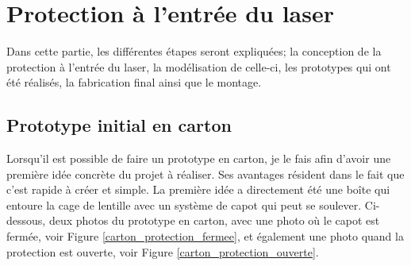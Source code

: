 \section{Protection à l'entrée du laser}
Dans cette partie, les différentes étapes seront expliquées; la conception de la protection à l'entrée du laser, la modélisation de celle-ci, les prototypes qui ont été réalisés, la fabrication final ainsi que le montage.
\subsection{Prototype initial en carton}
Lorsqu'il est possible de faire un prototype en carton, je le fais afin d'avoir une première idée concrète du projet à réaliser. Ses avantages résident dans le fait que c'est rapide à créer et simple. La première idée a directement été une boîte qui entoure la cage de lentille avec un système de capot qui peut se soulever. Ci-dessous, deux photos du prototype en carton, avec une photo où le capot est fermée, voir Figure \ref{carton_protection_fermee}, et également une photo quand la protection est ouverte, voir Figure \ref{carton_protection_ouverte}.

